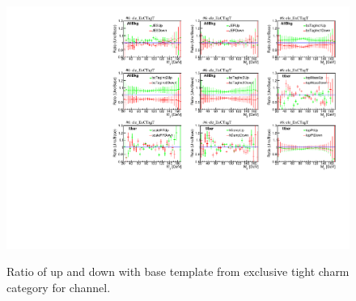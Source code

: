\begin{figure}
    \centering
    {\includegraphics[width=0.95\linewidth]{Image/SYS/RatioBaseSys/mjj_6_ele_ExCTagT.pdf}}
    \caption{ Ratio of up and down with base template from exclusive tight charm category for \ejets channel.}
    \label{fig:shapeVslnN6}
\end{figure}


